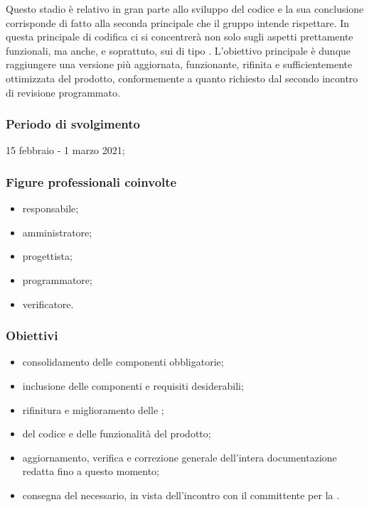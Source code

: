 Questo stadio è relativo in gran parte allo sviluppo del codice e la sua conclusione corrisponde di fatto alla seconda  principale che il gruppo \Gruppo{} intende rispettare. In questa  principale di codifica ci si concentrerà non solo sugli aspetti prettamente funzionali, ma anche, e soprattuto, sui  di tipo . L'obiettivo principale è dunque raggiungere una versione più aggiornata, funzionante, rifinita e sufficientemente ottimizzata del prodotto, conformemente a quanto richiesto dal secondo incontro di revisione programmato.
        
        \subsubsection{Periodo di svolgimento}
        15 febbraio - 1 marzo 2021;
        
        \subsubsection{Figure professionali coinvolte}
            \begin{itemize}
                \item responsabile;
                \item amministratore;
                \item progettista;
                \item programmatore;
                \item verificatore.
            \end{itemize}

        \subsubsection{Obiettivi}
        \begin{itemize}
            \item consolidamento delle componenti obbligatorie;
            \item inclusione delle componenti e requisiti desiderabili;
            \item rifinitura e miglioramento delle ;
            \item {} del codice e delle funzionalità del prodotto;
            \item aggiornamento, verifica e correzione generale dell'intera documentazione redatta fino a questo momento;
            \item consegna del  necessario, in vista dell'incontro con il committente per la \RP{}.
        \end{itemize}
